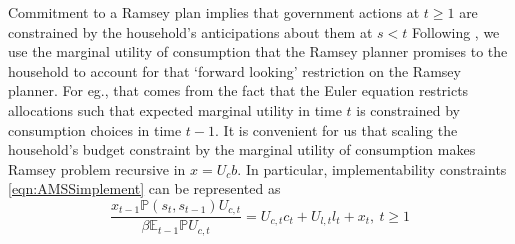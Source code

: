 \documentclass[12pt]{article}
\newcommand{\EE}{\mathbb E}
\begin{document}
  Commitment to a Ramsey plan implies that government actions at $t \geq 1$ are constrained by the household's anticipations about them at $s < t$
	 Following \citet{Kydland1980}, we  use the  marginal utility of consumption that the
Ramsey planner promises to the household to account for that `forward looking' restriction on the Ramsey planner. For eg., that comes from the fact that the Euler equation restricts allocations such that expected marginal utility in time $t$ is constrained by consumption choices in time $t-1$.  It is convenient for us that scaling the household's  budget constraint by the  marginal utility
 of consumption makes Ramsey problem  recursive in  $x=U_c b$.  In particular, implementability constraints \eqref{eqn:AMSSimplement}
 can be represented as
		\begin{equation}
		\frac{x_{t-1} \mathbb{P}(s_t,s_{t-1}) U_{c,t}}{\beta \EE_{t-1} \mathbb{P}U_{c,t}}  = U_{c,t}c_t+U_{l,t} l_t + x_t, \ t \geq 1
	\end{equation}
\end{document}
